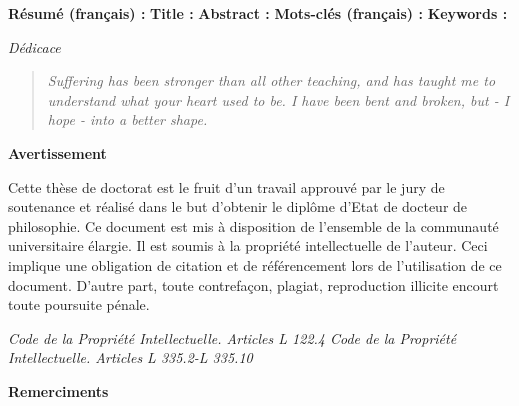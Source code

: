 \begin{titlepage}
\clearpage


\newpage
\thispagestyle{empty}
\noindent %
\textbf{Résumé (français) :}
\vskip 1cm
\noindent
\textbf{Title :}
\vskip 1cm
\noindent
\textbf{Abstract :}
\vskip 1cm
\noindent
\textbf{Mots-clés (français) :}
\vskip 1cm
\noindent
\textbf{Keywords :}


\newpage
\emph{Dédicace}
\vspace*{\fill}
 \begin{quote}
 \emph{Suffering has been stronger than all other teaching, and has taught me to understand what your heart used to be. I have been bent and broken, but - I hope - into a better shape.}
 \end{quote}
 \vspace*{\fill}

\newpage
\thispagestyle{empty}
\begin{center}
\large{\textbf{Avertissement}}
\end{center}
\vspace{2cm}
Cette thèse de doctorat est le fruit d’un travail approuvé par le jury de soutenance et
réalisé dans le but d’obtenir le diplôme d’Etat de docteur de philosophie. Ce document
est mis à disposition de l’ensemble de la communauté universitaire élargie.
Il est soumis à la propriété intellectuelle de l’auteur. Ceci implique une obligation de
citation et de référencement lors de l’utilisation de ce document.
D’autre part, toute contrefaçon, plagiat, reproduction illicite encourt toute poursuite
pénale.
\vspace*{\fill}

\emph{Code de la Propriété Intellectuelle. Articles L 122.4 \newline
Code de la Propriété Intellectuelle. Articles L 335.2-L 335.10}


\newpage
\thispagestyle{empty}
\begin{center}
\large{\textbf{Remerciments}}
\end{center}
\vspace{2cm}


\end{titlepage}
